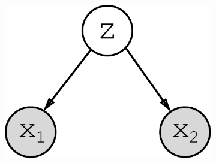 \documentclass{article}
\begin{document}
\begin{figure}[h!]
\centering
    \begin{subfigure}[b]{.24\linewidth}
        \centering
        \includegraphics[width=.75\linewidth]{graph.pdf}
        \caption{}
        \label{fig:diagram:graph}
    \end{subfigure}\hspace{5mm}
    \begin{subfigure}[b]{.10\linewidth}

\end{subfigure}
\end{figure}
\end{document}
